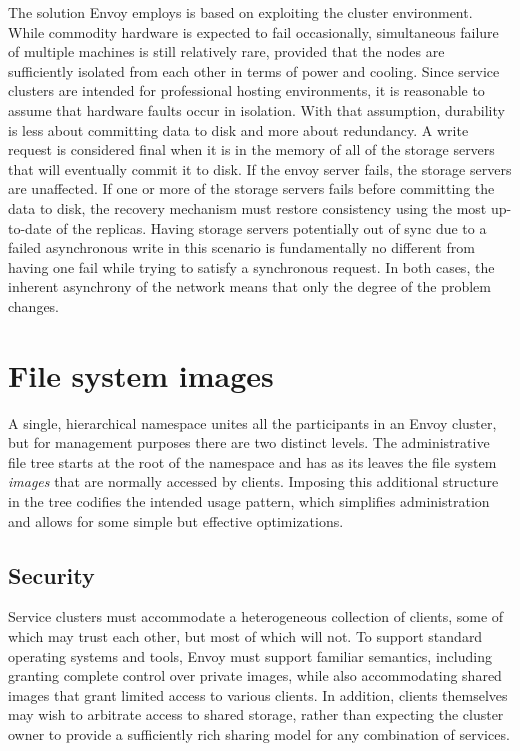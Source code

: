 The solution Envoy employs is based on exploiting the cluster environment. While commodity hardware is expected to fail occasionally, simultaneous failure of multiple machines is still relatively rare, provided that the nodes are sufficiently isolated from each other in terms of power and cooling. Since service clusters are intended for professional hosting environments, it is reasonable to assume that hardware faults occur in isolation. With that assumption, durability is less about committing data to disk and more about redundancy. A write request is considered final when it is in the memory of all of the storage servers that will eventually commit it to disk. If the envoy server fails, the storage servers are unaffected. If one or more of the storage servers fails before committing the data to disk, the recovery mechanism must restore consistency using the most up-to-date of the replicas. Having storage servers potentially out of sync due to a failed asynchronous write in this scenario is fundamentally no different from having one fail while trying to satisfy a synchronous request. In both cases, the inherent asynchrony of the network means that only the degree of the problem changes.

\section{File system images}

A single, hierarchical namespace unites all the participants in an Envoy cluster, but for management purposes there are two distinct levels. The administrative file tree starts at the root of the namespace and has as its leaves the file system \emph{images} that are normally accessed by clients. Imposing this additional structure in the tree codifies the intended usage pattern, which simplifies administration and allows for some simple but effective optimizations.

\subsection{Security}

Service clusters must accommodate a heterogeneous collection of clients, some of which may trust each other, but most of which will not. To support standard operating systems and tools, Envoy must support familiar semantics, including granting complete control over private images, while also accommodating shared images that grant limited access to various clients. In addition, clients themselves may wish to arbitrate access to shared storage, rather than expecting the cluster owner to provide a sufficiently rich sharing model for any combination of services.

